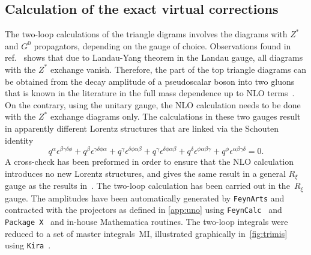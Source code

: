 \subsection{Calculation of the exact virtual corrections}
The two-loop calculations of the triangle digrams involves the diagrams with $Z^*$ and $G^0$ propagators, depending on the gauge of choice. Observations found in ref.~\cite{Altenkamp:2012sx} shows that due to Landau-Yang theorem in the Landau gauge, all diagrams with the  $Z^*$ exchange vanish. Therefore, the part of the top triangle diagrams  can be obtained from the decay amplitude of a pseudoscalar boson into two gluons that is known in the literature in the full mass dependence up to NLO terms~\cite{Spira:1995rr,Aglietti:2006tp}. On the contrary, using the unitary gauge, the NLO calculation needs to be done with the $Z^*$ exchange diagrams only.  The calculations in these two gauges result in apparently different Lorentz structures that are linked via the Schouten identity 
\begin{equation}
	q^\alpha \epsilon^{\beta \gamma \delta  \phi} + q^\beta \epsilon^{\gamma \delta  \phi \alpha}+ q^\gamma \epsilon^{ \delta  \phi \alpha \beta} +q^\gamma \epsilon^{ \delta  \phi \alpha \beta} + q^\delta \epsilon^{   \phi \alpha \beta \gamma } +  q^\phi \epsilon^{ \alpha \beta \gamma \delta } =0 .
\end{equation}
A cross-check has been preformed in order to ensure that the NLO calculation introduces no new Lorentz structures, and gives the same result in a general $ R_\xi$ gauge as the results in~\cite{Spira:1995rr,Aglietti:2006tp}. The two-loop calculation has been carried out in the~$ R_\xi$ gauge. The amplitudes have been automatically generated by \texttt{FeynArts} \cite{Hahn:2000kx} and
contracted with the projectors as defined in \autoref{app:uno}
using \texttt{FeynCalc }\cite{Mertig:1990an,Shtabovenko:2016sxi} and \texttt{Package X}~\cite{Patel:2016fam} and in-house
Mathematica routines. The two-loop integrals were reduced to a set of master integrals~MI, illustrated graphically in~\autoref{fig:trimis} using \texttt{Kira}~\cite{Maierhofer:2017gsa}.

